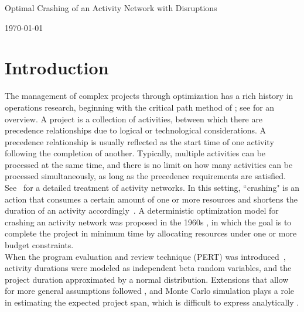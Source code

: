 \documentclass[11pt]{article}
\newcommand{\ms}{\medskip}
\begin{document}
	\baselineskip0.25in
	
	\begin{center}
		\begin{large}
			\begin{bf}
				
				Optimal Crashing of an Activity Network with Disruptions \ms
				
				\today \ms
			\end{bf}
		\end{large}
	\end{center}
	
	\section{Introduction} \label{sec:introduction}
	The management of complex projects through optimization has a rich history in operations research, beginning with the critical path method of \cite{kelley1961criticalpath}; see \citet{soderlund2004building} for an overview. A project is a collection of activities, between which there are precedence relationships due to logical or technological considerations. A precedence relationship is usually reflected as the start time of one activity following the completion of another. 
	Typically, multiple activities can be processed at the same time, and there is no limit on how many activities can be processed simultaneously, as long as the precedence requirements are satisfied. See~\citet{Elmaghraby77} for a detailed treatment of activity networks. In this setting, ``crashing" is an action that consumes a certain amount of one or more resources and shortens the duration of an activity accordingly~\citep{kuhl2008dynamic}. A deterministic optimization model for crashing an activity network was proposed in the 1960s \citep{fulkerson1961network, kelley1961criticalpath}, in which the goal is to complete the project in minimum time by allocating resources under one or more budget constraints.\\
	\newline
	When the program evaluation and review technique (PERT) was introduced~\citep{malcolm1959application}, activity durations were modeled as independent beta random variables, and the project duration approximated by a normal distribution. Extensions that allow for more general assumptions followed \citep{Elmaghraby77}, and Monte Carlo simulation plays a role in estimating the expected project span, which is difficult to express analytically \citep{burt1971conditional,van1963letter}.
\end{document}
